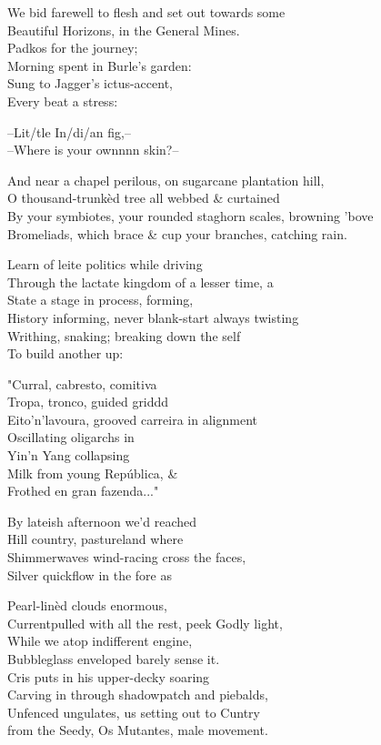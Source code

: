 We bid farewell to flesh and set out towards some \\
Beautiful Horizons, in the General Mines. \\

Padkos for the journey; \\
Morning spent in Burle's garden: \\
Sung to Jagger's ictus-accent, \\
Every beat a stress:

--Lit/tle In/di/an fig,-- \\
--Where is your ownnnn skin?--

And near a chapel perilous, on sugarcane plantation hill, \\
O thousand-trunkèd tree all webbed \& curtained \\
By your symbiotes, your rounded staghorn scales, browning 'bove \\
Bromeliads, which brace \& cup your branches, catching rain.

Learn of leite politics while driving \\
Through the lactate kingdom of a lesser time, a \\
State a stage in process, forming, \\
History informing, never blank-start always twisting \\
Writhing, snaking; breaking down the self \\
To build another up:

"Curral, cabresto, comitiva \\
Tropa, tronco, guided griddd \\
Eito'n'lavoura, grooved carreira in alignment \\
Oscillating oligarchs in \\
Yin'n Yang collapsing \\
Milk from young República, \& \\
Frothed en gran fazenda..."

By lateish afternoon we'd reached \\
Hill country, pastureland where \\
Shimmerwaves wind-racing cross the faces, \\
Silver quickflow in the fore as

Pearl-linèd clouds enormous, \\
Currentpulled with all the rest, peek Godly light, \\
While we atop indifferent engine, \\
Bubbleglass enveloped barely sense it. \\
Cris puts in his upper-decky soaring \\
Carving in through shadowpatch and piebalds, \\
Unfenced ungulates, us setting out to Cuntry \\
from the Seedy, Os Mutantes, male movement.


